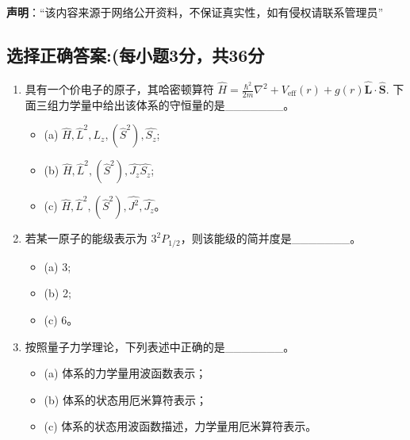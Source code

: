 
\textbf{声明}：“该内容来源于网络公开资料，不保证真实性，如有侵权请联系管理员”

\subsection{选择正确答案:(每小题3分，共36分}
\begin{enumerate}
\item  具有一个价电子的原子，其哈密顿算符 $\hat{H} = \frac{\hbar^2}{2m} \nabla^2 + V_{\text{eff}}(r) + g(r) \mathbf{\hat L} \cdot \mathbf{\hat S}$. 下面三组力学量中给出该体系的守恒量的是_______。
    \begin{itemize}
        \item (a) $\hat{H}, \hat{L}^2, L_z, (\hat{S}^2), \hat{S_z}$;
        \item (b) $\hat{H}, \hat{L}^2, (\hat{S}^2), \hat{J_z}\hat{S_z}$;
        \item (c) $\hat{H}, \hat{L}^2, (\hat{S}^2), \hat{J^2},\hat{J_z}$。
    \end{itemize}
\item  若某一原子的能级表示为 $3^2P_{1/2}$，则该能级的简并度是_______。
 \begin{itemize}
        \item (a) 3;
        \item (b) 2;
        \item (c) 6。
    \end{itemize}
    \item 按照量子力学理论，下列表述中正确的是_______。
    \begin{itemize}
        \item (a) 体系的力学量用波函数表示；
        \item (b) 体系的状态用厄米算符表示；
        \item (c) 体系的状态用波函数描述，力学量用厄米算符表示。
    \end{itemize}
\end{enumerate}
